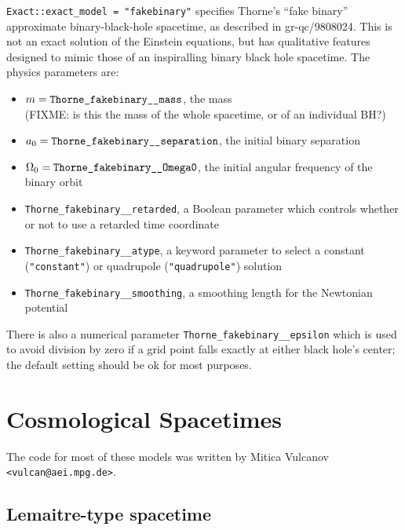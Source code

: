 \verb|Exact::exact_model = "fakebinary"| specifies Thorne's ``fake binary''
approximate binary-black-hole spacetime, as described in gr-qc/9808024.
This is not an exact solution of the Einstein equations, but has
qualitative features designed to mimic those of an inspiralling
binary black hole spacetime.  The physics parameters are:
\begin{itemize}
\item	$m = \verb|Thorne_fakebinary__mass|$, the mass\\
	(FIXME: is this the mass of the whole spacetime,
	or of an individual BH?)
\item	$a_0 = \verb|Thorne_fakebinary__separation|$, the initial binary
	separation
\item	$\Omega_0 = \verb|Thorne_fakebinary__Omega0|$, the initial
	angular frequency of the binary orbit
\item	\verb|Thorne_fakebinary__retarded|, a Boolean parameter which
	controls whether or not to use a retarded time coordinate
\item	\verb|Thorne_fakebinary__atype|, a keyword parameter to
	select a constant (\verb|"constant"|)
	or quadrupole (\verb|"quadrupole"|) solution
\item	\verb|Thorne_fakebinary__smoothing|, a smoothing length for
	the Newtonian potential
\end{itemize}

There is also a numerical parameter \verb|Thorne_fakebinary__epsilon|
which is used to avoid division by zero if a grid point falls exactly
at either black hole's center; the default setting should be ok for
most purposes.


\section{Cosmological Spacetimes}

The code for most of these models was written by
Mitica Vulcanov \verb|<vulcan@aei.mpg.de>|.


\subsection{Lemaitre-type spacetime}

